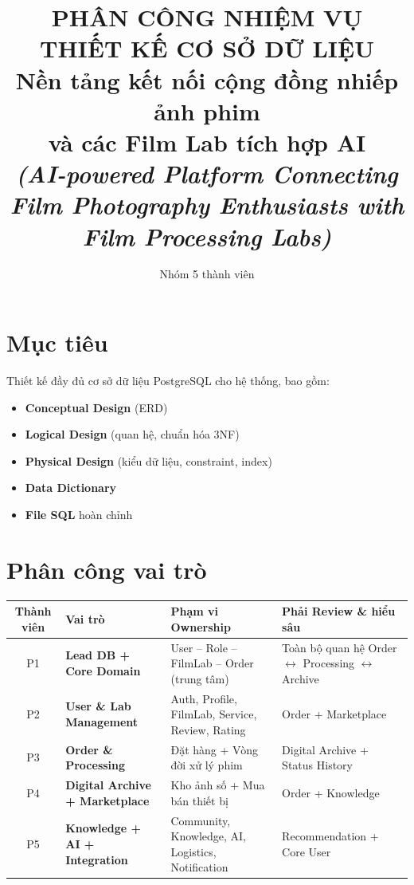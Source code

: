 \documentclass[12pt,a4paper]{article}
\title{\textbf{\Large PHÂN CÔNG NHIỆM VỤ}\\[0.2em]\textbf{\Large THIẾT KẾ CƠ SỞ DỮ LIỆU}\\[0.5em]
{\normalsize Nền tảng kết nối cộng đồng nhiếp ảnh phim\\và các Film Lab tích hợp AI}\\[0.3em]
{\small\textit{(AI-powered Platform Connecting Film Photography Enthusiasts with Film Processing Labs)}}}
\author{Nhóm 5 thành viên}
\date{}
\begin{document}
\maketitle
\thispagestyle{empty}
\newpage

\section{Mục tiêu}

Thiết kế đầy đủ cơ sở dữ liệu PostgreSQL cho hệ thống, bao gồm:

\begin{itemize}[leftmargin=*]
    \item \textbf{Conceptual Design} (ERD)
    \item \textbf{Logical Design} (quan hệ, chuẩn hóa 3NF)
    \item \textbf{Physical Design} (kiểu dữ liệu, constraint, index)
    \item \textbf{Data Dictionary}
    \item \textbf{File SQL} hoàn chỉnh
\end{itemize}



\vspace{10pt}

\section{Phân công vai trò}

\begin{table}[h]
\centering
\begin{tabular}{@{}clp{5.5cm}p{5cm}@{}}
\toprule
\textbf{Thành viên} & \textbf{Vai trò} & \textbf{Phạm vi Ownership} & \textbf{Phải Review \& hiểu sâu} \\
\midrule
P1 & \textbf{Lead DB + Core Domain} & User -- Role -- FilmLab -- Order (trung tâm) & Toàn bộ quan hệ Order $\leftrightarrow$ Processing $\leftrightarrow$ Archive \\
P2 & \textbf{User \& Lab Management} & Auth, Profile, FilmLab, Service, Review, Rating & Order + Marketplace \\
P3 & \textbf{Order \& Processing} & Đặt hàng + Vòng đời xử lý phim & Digital Archive + Status History \\
P4 & \textbf{Digital Archive + Marketplace} & Kho ảnh số + Mua bán thiết bị & Order + Knowledge \\
P5 & \textbf{Knowledge + AI + Integration} & Community, Knowledge, AI, Logistics, Notification & Recommendation + Core User \\
\bottomrule
\end{tabular}
\end{table}
\end{document}
